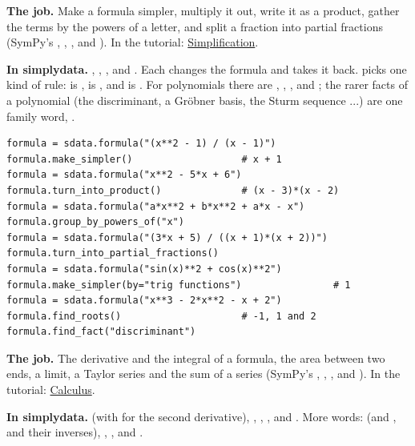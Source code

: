 
\textbf{The job.} Make a formula simpler, multiply it out, write it as a product, gather the terms by
the powers of a letter, and split a fraction into partial fractions (SymPy's ,
, ,  and ). In the tutorial:
\href{https://docs.sympy.org/latest/tutorials/intro-tutorial/simplification.html}{Simplification}.

\textbf{In simplydata.} , , ,
 and . Each changes the formula and
 takes it back.  picks one kind of rule:  is
,  is , and  is
. For polynomials there are , , ,
 and ; the rarer facts of a polynomial
(the discriminant, a Gr\"obner basis, the Sturm sequence ...) are one family word, .

\begin{lstlisting}[style=py]
formula = sdata.formula("(x**2 - 1) / (x - 1)")
formula.make_simpler()                   # x + 1
formula = sdata.formula("x**2 - 5*x + 6")
formula.turn_into_product()              # (x - 3)*(x - 2)
formula = sdata.formula("a*x**2 + b*x**2 + a*x - x")
formula.group_by_powers_of("x")
formula = sdata.formula("(3*x + 5) / ((x + 1)*(x + 2))")
formula.turn_into_partial_fractions()
formula = sdata.formula("sin(x)**2 + cos(x)**2")
formula.make_simpler(by="trig functions")                # 1
formula = sdata.formula("x**3 - 2*x**2 - x + 2")
formula.find_roots()                     # -1, 1 and 2
formula.find_fact("discriminant")
\end{lstlisting}


\textbf{The job.} The derivative and the integral of a formula, the area between two ends, a limit,
a Taylor series and the sum of a series (SymPy's , , ,
 and ). In the tutorial:
\href{https://docs.sympy.org/latest/tutorials/intro-tutorial/calculus.html}{Calculus}.

\textbf{In simplydata.}  (with  for the second
derivative), , ,
,  and . More words:
 (and ,  and their inverses),
, ,  and
.

